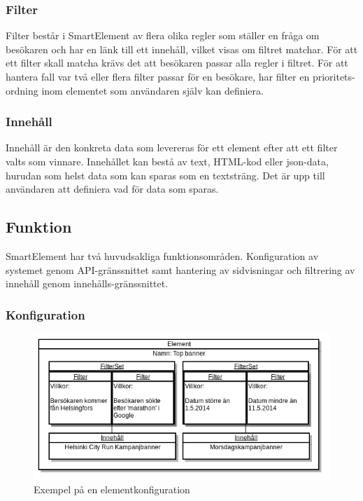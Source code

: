 \subsubsection{Filter}

Filter består i SmartElement av flera olika regler som ställer en fråga om besökaren och har en länk till ett innehåll, vilket visas om filtret matchar. För att ett filter skall matcha krävs det att besökaren passar alla regler i filtret. För att hantera fall var två eller flera filter passar för en besökare, har filter en prioritets-ordning inom elementet som användaren själv kan definiera.

\subsubsection{Innehåll}

Innehåll är den konkreta data som levereras för ett element efter att ett filter valts som vinnare. Innehållet kan bestå av text, HTML-kod eller \gls{json}-data, hurudan som helst data som kan sparas som en textsträng. Det är upp till användaren att definiera vad för data som sparas.

\subsection{Funktion}

SmartElement har två huvudsakliga funktionsområden. Konfiguration av systemet genom API-gränssnittet samt hantering av sidvisningar och filtrering av innehåll genom innehålls-gränssnittet.

\subsubsection{Konfiguration}

\begin{figure}[h!]
\centering
\includegraphics[width=150mm]{assets/images/smelementelement.png}
\caption{Exempel på en elementkonfiguration}
\label{smelementelement}
\end{figure}

